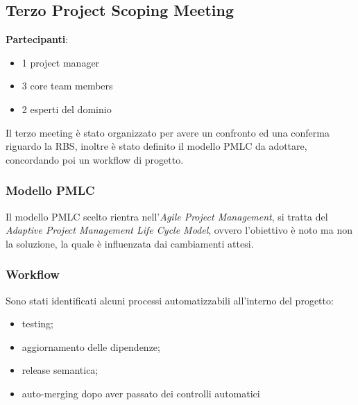 \subsection{Terzo Project Scoping Meeting}
\textbf{Partecipanti}:
\begin{itemize}
    \item 1 project manager
    \item 3 core team members
    \item 2 esperti del dominio
\end{itemize}

Il terzo meeting è stato organizzato per avere un confronto ed una conferma riguardo la RBS, inoltre è stato definito il modello PMLC
da adottare, concordando poi un workflow di progetto.

\subsubsection{Modello PMLC}
Il modello PMLC scelto rientra nell'\textit{Agile Project Management}, si tratta del \textit{Adaptive Project Management
    Life Cycle Model}, ovvero l'obiettivo è noto ma non la soluzione, la quale è influenzata dai cambiamenti attesi.


\subsubsection{Workflow}
Sono stati identificati alcuni processi automatizzabili all'interno del progetto:
\begin{itemize}
    \item testing;
    \item aggiornamento delle dipendenze;
    \item release semantica;
    \item auto-merging dopo aver passato dei controlli automatici
\end{itemize}

